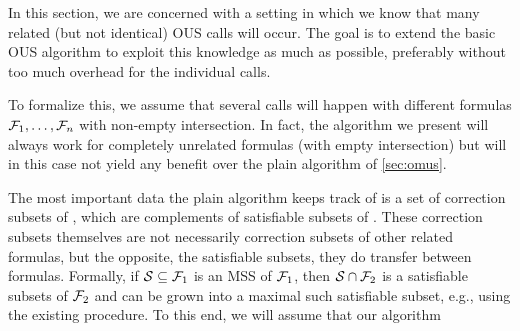 In this section, we are concerned with a setting in which we know that many related (but not identical) OUS calls will occur. The goal is to extend the basic OUS algorithm to exploit this knowledge as much as possible, preferably without too much overhead for the individual calls. 

\newcommand\fall{\mm{\formula_{\mathit{all}}}}
To formalize this, we assume that several \omus calls will happen with different formulas $\mathcal{F} _1,\dots,\mathcal{F} _n$ with non-empty intersection. In fact, the algorithm we present will always work for completely unrelated formulas (with empty intersection) but will in this case not yield any benefit over the plain \omus algorithm of \cref{sec:omus}. 

The most important data the plain \omus algorithm keeps track of is a set of correction subsets of \formula, which are complements of satisfiable subsets of \formula.
These correction subsets themselves are not necessarily correction subsets of other related formulas, but the opposite, the satisfiable subsets, they do transfer between formulas. Formally, if $\mathcal{S} \subseteq \mathcal{F} _1$ is an MSS of $\mathcal{F} _1$, then $\mathcal{S}\cap \mathcal{F} _2$ is a satisfiable subsets of $\mathcal{F} _2$ and can be grown into a maximal such satisfiable subset, e.g., using the existing \grow procedure. 
To this end, we will assume that our algorithm 



